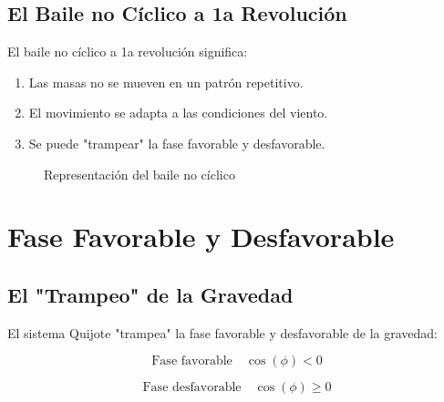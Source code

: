 \documentclass[12pt,a4paper]{article}
\begin{document}
\subsection{El Baile no Cíclico a 1a Revolución}

El baile no cíclico a 1a revolución significa:

\begin{enumerate}
    \item Las masas no se mueven en un patrón repetitivo.
    \item El movimiento se adapta a las condiciones del viento.
    \item Se puede "trampear" la fase favorable y desfavorable.
\end{enumerate}

\begin{figure}[H]
\centering
{}
\caption{Representación del baile no cíclico}
\label{fig:baile}
\end{figure}

\section{Fase Favorable y Desfavorable}

\subsection{El "Trampeo" de la Gravedad}

El sistema Quijote "trampea" la fase favorable y desfavorable de la gravedad:

\begin{equation}
\text{Fase favorable} \quad \cos(\phi) < 0
\end{equation}

\begin{equation}
\text{Fase desfavorable} \quad \cos(\phi) \geq 0
\end{equation}
\end{document}
